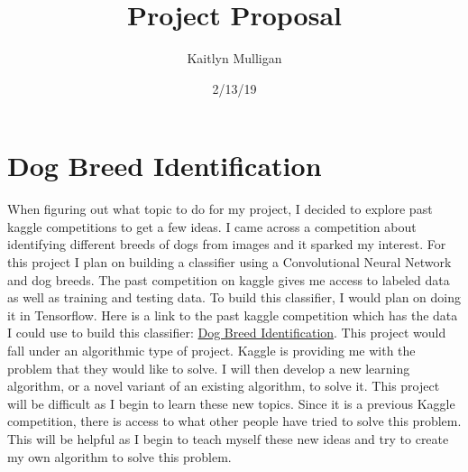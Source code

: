 \documentclass[a4paper]{article}
\title{Project Proposal}
\author{Kaitlyn Mulligan}
\date{2/13/19}
\begin{document}
\lstset{language=Python}

\maketitle

\section{Dog Breed Identification}
When figuring out what topic to do for my project, I decided to explore past kaggle 
competitions to get a few ideas.  I came across a competition about identifying 
different breeds of dogs from images and it sparked my interest.  For this project 
I plan on building a classifier using a Convolutional Neural Network and dog 
breeds.  The past competition on kaggle gives me access to labeled data as well 
as training and testing data.  To build this classifier, I would plan on doing it 
in Tensorflow.  Here is a link to the past kaggle competition which has the data I 
could use to build this classifier: \href{https://www.kaggle.com/c/dog-breed-identification}
{Dog Breed Identification}.  This project would fall under an algorithmic type of project.  
Kaggle is providing me with the problem that they would like to solve.  I will then develop 
a new learning algorithm, or a novel variant of an existing algorithm, to solve it.  This 
project will be difficult as I begin to learn these new topics.  Since it is a previous 
Kaggle competition, there is access to what other people have tried to solve this problem.  
This will be helpful as I begin to teach myself these new ideas and try to create my own 
algorithm to solve this problem.
\end{document}
